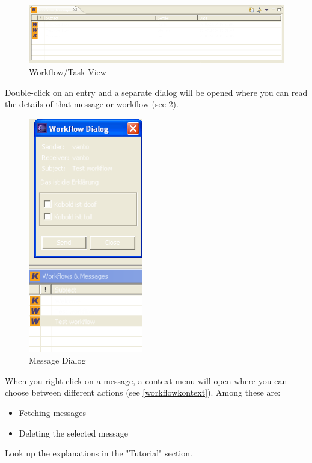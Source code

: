 \begin{figure}[h!]
\begin{center}
\includegraphics[width=15cm]{workflow.png}
   \caption{Workflow/Task View}
\label{workflow}
\end{center}
\end{figure}\par

Double-click on an entry and a 
separate dialog will be opened where you can read the details of that message or
workflow (see \ref{workflowdialog}).

\begin{figure}[h!]
\begin{center}
\includegraphics[width=5cm]{workflowdialog.png}
   \caption{Message Dialog}
\label{workflowdialog}
\end{center}
\end{figure}\par

When you right-click on a message, a context menu will open where you can choose 
between different actions (see \ref{workflowkontext}). Among these are:

\begin{itemize}
	\item Fetching messages
	\item Deleting the selected message
\end{itemize}
Look up the explanations in the "Tutorial" section.

